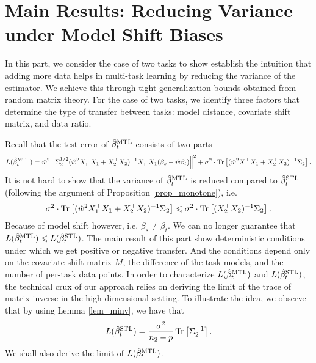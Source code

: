 \section{Main Results: Reducing Variance under Model Shift Biases}\label{sec_denoise}

In this part, we consider the case of two tasks to show  establish the intuition that adding more data helps in multi-task learning by reducing the variance of the estimator.
We achieve this through tight generalization bounds obtained from random matrix theory.
For the case of two tasks, we identify three factors that determine the type of transfer between tasks: model distance, covariate shift matrix, and data ratio.

Recall that the test error of $\hat{\beta}_{t}^{\text{MTL}}$ consists of two parts
\begin{align}
	L(\hat{\beta}_t^{\text{MTL}}) = \hat{w}^2 \left\| \Sigma_2^{1/2} (\hat{w}^2 X_1^{\top}X_1 + X_2^{\top}X_2)^{-1}X_1^{\top}X_1 (\beta_s - \hat{w}\beta_t) \right\|^2 + \sigma^2\cdot \operatorname{Tr}\left[(\hat{w}^2 X_1^{\top}X_1 + X_2^{\top}X_2)^{-1}\Sigma_2\right]. \label{eq_te_model_shift}
\end{align}
It is not hard to show that the variance of $\hat{\beta}_t^{\text{MTL}}$ is reduced compared to $\hat{\beta}_t^{\text{STL}}$ (following the argument of Proposition \ref{prop_monotone}), i.e.
\[ \sigma^2\cdot \operatorname{Tr}\left[(\hat{w}^2 X_1^{\top}X_1 + X_2^{\top}X_2)^{-1}\Sigma_2\right] \leqslant \sigma^2\cdot \operatorname{Tr}\left[(X_2^{\top}X_2)^{-1}\Sigma_2\right]. \]
Because of model shift however, i.e. $\beta_s \neq \beta_t$.
We can no longer guarantee that $L(\hat{\beta}_{t}^{\text{MTL}}) \leqslant L(\hat{\beta}_t^{\text{STL}})$.
The main result of this part show deterministic conditions under which we get positive or negative transfer.
And the conditions depend only on the covariate shift matrix $M$, the difference of the task models, and the number of per-task data points.
In order to characterize $L(\hat{\beta}_t^{\text{MTL}})$ and $L(\hat{\beta}_t^{\text{STL}})$, the technical crux of our approach relies on deriving the limit of the trace of matrix inverse in the high-dimensional setting.
To illustrate the idea, we observe that by using Lemma \ref{lem_minv}, we have that
\[ L(\hat{\beta}_t^{\text{STL}}) = \frac{\sigma^2}{n_2 - p}\operatorname{Tr}\left[\Sigma_2^{-1}\right]. \]
We shall also derive the limit of $L(\hat{\beta}_t^{\text{MTL}})$.

